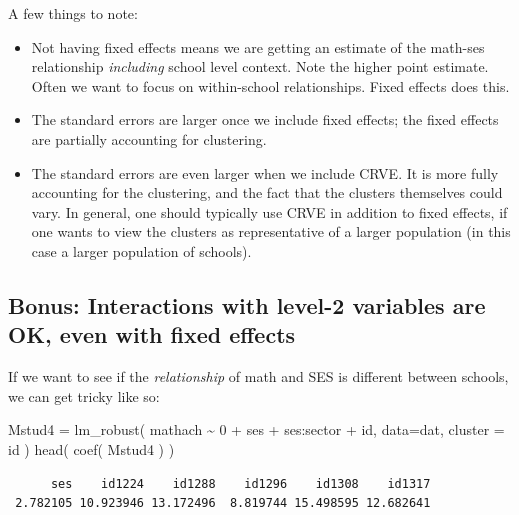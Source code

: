 \documentclass[
  letterpaper,
  DIV=11,
  numbers=noendperiod]{scrreprt}
\newenvironment{Shaded}{\begin{snugshade}}{\end{snugshade}}
\newcommand{\AttributeTok}[1]{\textcolor[rgb]{0.49,0.56,0.16}{#1}}
\newcommand{\DecValTok}[1]{\textcolor[rgb]{0.25,0.63,0.44}{#1}}
\newcommand{\FunctionTok}[1]{\textcolor[rgb]{0.02,0.16,0.49}{#1}}
\newcommand{\NormalTok}[1]{\textcolor[rgb]{0.00,0.44,0.13}{#1}}
\newcommand{\OtherTok}[1]{\textcolor[rgb]{0.00,0.44,0.13}{#1}}
\newcommand{\SpecialCharTok}[1]{\textcolor[rgb]{0.25,0.44,0.63}{#1}}
\providecommand{\tightlist}{%
  \setlength{\itemsep}{0pt}\setlength{\parskip}{0pt}}\usepackage{longtable,booktabs,array}
\begin{document}
A few things to note:

\begin{itemize}
\tightlist
\item
  Not having fixed effects means we are getting an estimate of the
  math-ses relationship \emph{including} school level context. Note the
  higher point estimate. Often we want to focus on within-school
  relationships. Fixed effects does this.
\item
  The standard errors are larger once we include fixed effects; the
  fixed effects are partially accounting for clustering.
\item
  The standard errors are even larger when we include CRVE. It is more
  fully accounting for the clustering, and the fact that the clusters
  themselves could vary. In general, one should typically use CRVE in
  addition to fixed effects, if one wants to view the clusters as
  representative of a larger population (in this case a larger
  population of schools).
\end{itemize}

\hypertarget{bonus-interactions-with-level-2-variables-are-ok-even-with-fixed-effects}{%
\subsection{Bonus: Interactions with level-2 variables are OK, even with
fixed
effects}\label{bonus-interactions-with-level-2-variables-are-ok-even-with-fixed-effects}}

If we want to see if the \emph{relationship} of math and SES is
different between schools, we can get tricky like so:

\begin{Shaded}
\begin{Highlighting}[]
\NormalTok{Mstud4 }\OtherTok{=} \FunctionTok{lm\_robust}\NormalTok{( mathach }\SpecialCharTok{\textasciitilde{}} \DecValTok{0} \SpecialCharTok{+}\NormalTok{ ses }\SpecialCharTok{+}\NormalTok{ ses}\SpecialCharTok{:}\NormalTok{sector }\SpecialCharTok{+}\NormalTok{ id, }
                    \AttributeTok{data=}\NormalTok{dat,}
                    \AttributeTok{cluster =}\NormalTok{ id )}
\FunctionTok{head}\NormalTok{( }\FunctionTok{coef}\NormalTok{( Mstud4 ) )}
\end{Highlighting}
\end{Shaded}

\begin{verbatim}
      ses    id1224    id1288    id1296    id1308    id1317 
 2.782105 10.923946 13.172496  8.819744 15.498595 12.682641 
\end{verbatim}
\end{document}
